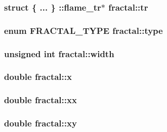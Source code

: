 \hypertarget{structfractal_a45a93c39e3799fa37101b4125a3d60a6}{
\subsubsection[{tr}]{\setlength{\rightskip}{0pt plus 5cm}struct \{ ... \} \-::flame\-\_\-tr$\ast$  {\bf fractal\-::tr}}}\label{structfractal_a45a93c39e3799fa37101b4125a3d60a6}
\hypertarget{structfractal_af8297a3673f15a8aa61272bdc0377277}{
\subsubsection[{type}]{\setlength{\rightskip}{0pt plus 5cm}enum {\bf \-F\-R\-A\-C\-T\-A\-L\-\_\-\-T\-Y\-P\-E} {\bf fractal\-::type}}}\label{structfractal_af8297a3673f15a8aa61272bdc0377277}
\hypertarget{structfractal_a2cbfae43b5e12a3c427c241a46145a31}{
\subsubsection[{width}]{\setlength{\rightskip}{0pt plus 5cm}unsigned int {\bf fractal\-::width}}}\label{structfractal_a2cbfae43b5e12a3c427c241a46145a31}
\hypertarget{structfractal_a25f9bab7277ce8cb9272a6e1ba1695f8}{
\subsubsection[{x}]{\setlength{\rightskip}{0pt plus 5cm}double {\bf fractal\-::x}}}\label{structfractal_a25f9bab7277ce8cb9272a6e1ba1695f8}
\hypertarget{structfractal_a9f41ac4812a14dde576142eaba71141f}{
\subsubsection[{xx}]{\setlength{\rightskip}{0pt plus 5cm}double {\bf fractal\-::xx}}}\label{structfractal_a9f41ac4812a14dde576142eaba71141f}
\hypertarget{structfractal_a5f558e90d4bc7b85f758e2f4e7b76fff}{
\subsubsection[{xy}]{\setlength{\rightskip}{0pt plus 5cm}double {\bf fractal\-::xy}}}\label{structfractal_a5f558e90d4bc7b85f758e2f4e7b76fff}
